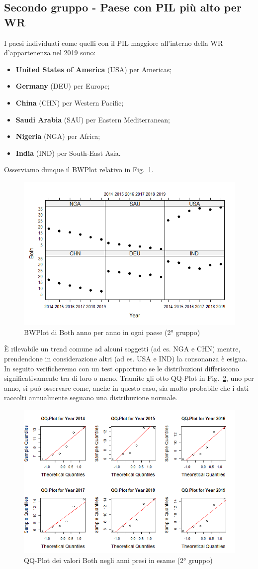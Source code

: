 \documentclass[conference]{IEEEtran}
\begin{document}
\subsection{Secondo gruppo - Paese con PIL più alto per WR}

I paesi individuati come quelli con il PIL maggiore \cite{b6} all'interno della WR
d'appartenenza nel 2019 sono:
\begin{itemize}
    \item \textbf{United States of America} (USA) per Americas;
    \item \textbf{Germany} (DEU) per Europe;
    \item \textbf{China} (CHN) per Western Pacific;
    \item \textbf{Saudi Arabia} (SAU) per Eastern Mediterranean;
    \item \textbf{Nigeria} (NGA) per Africa;
    \item \textbf{India} (IND) per South-East Asia. 
\end{itemize}
Osserviamo dunque il BWPlot relativo in Fig.~\ref{7secondgroup}.
\begin{figure}[htbp]
    \centerline{\includegraphics[width=.5\textwidth]{img/7 - Secondgroup.png}}
    \caption{BWPlot di Both anno per anno in ogni paese (2° gruppo)}
    \label{7secondgroup}
\end{figure}
\`E rilevabile un trend comune ad alcuni soggetti (ad es. NGA e CHN) mentre, prendendone
in considerazione altri (ad es. USA e IND) la consonanza è esigua.
In seguito verificheremo con un test opportuno se le distribuzioni differiscono significativamente
tra di loro o meno.
Tramite gli otto QQ-Plot in Fig.~\ref{8secondqq}, uno per anno, si può osservare come, anche in questo caso,
sia molto probabile che i dati raccolti annualmente seguano una distribuzione normale.
\begin{figure}[htbp]
    \centerline{\includegraphics[width=.5\textwidth]{img/8 - Secondqq.png}}
    \caption{QQ-Plot dei valori Both negli anni presi in esame (2° gruppo)}
    \label{8secondqq}
\end{figure}
\end{document}
